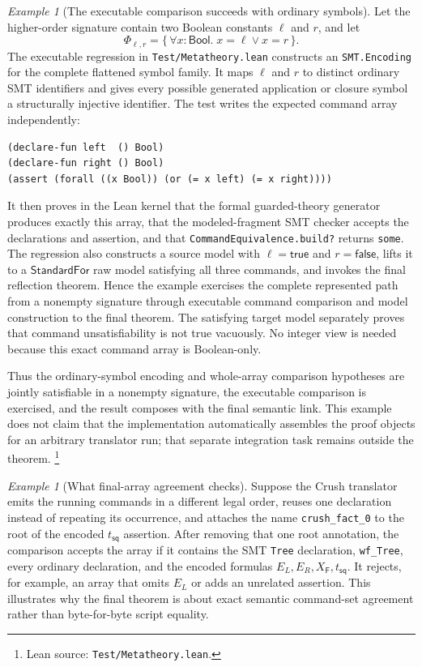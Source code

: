 \documentclass[11pt]{article}
\theoremstyle{remark}
\newtheorem{example}[definition]{Example}
\newcommand{\leanpaths}[1]{\footnote{Lean source: \texttt{#1}.}}
\newcommand{\Bool}{\mathsf{Bool}}
\newcommand{\TreeFun}{\mathsf{F}}
\begin{document}
\begin{example}[The executable comparison succeeds with ordinary symbols]
Let the higher-order signature contain two Boolean constants $\ell$ and $r$, and
let
\[
  \Phi_{\ell,r} = \{\,\forall x:\Bool.\;x=\ell\lor x=r\,\}.
\]
The executable regression in \texttt{Test/Metatheory.lean} constructs an
\texttt{SMT.Encoding} for the complete flattened symbol family. It maps
$\ell$ and $r$ to distinct ordinary SMT identifiers and gives every possible
generated application or closure symbol a structurally injective identifier.
The test writes the expected command array independently:
\begin{verbatim}
(declare-fun left  () Bool)
(declare-fun right () Bool)
(assert (forall ((x Bool)) (or (= x left) (= x right))))
\end{verbatim}
It then proves in the Lean kernel that the formal guarded-theory generator
produces exactly this array, that the modeled-fragment SMT checker accepts the
declarations and assertion, and that \texttt{CommandEquivalence.build?} returns
\texttt{some}. The regression also constructs a source model with
$\ell=\mathsf{true}$ and $r=\mathsf{false}$, lifts it to a
$\mathsf{StandardFor}$ raw model satisfying all three commands, and invokes the
final reflection theorem. Hence the example exercises the complete represented
path from a nonempty signature through executable command comparison and model
construction to the final theorem. The satisfying target model separately
proves that command unsatisfiability is not true vacuously. No integer view is
needed because this exact command array is Boolean-only.

Thus the ordinary-symbol encoding and whole-array comparison hypotheses are
jointly satisfiable in a nonempty signature, the executable comparison is
exercised, and the result composes with the final semantic link.
This example does not claim that the implementation automatically assembles the
proof objects for an arbitrary translator run; that separate integration task
remains outside the theorem.
\leanpaths{Test/Metatheory.lean}
\end{example}

\begin{example}[What final-array agreement checks]
Suppose the Crush translator emits the running commands in a different legal order,
reuses one declaration instead of repeating its occurrence, and attaches the
name \texttt{crush\_fact\_0} to the root of the encoded
$t_{\mathsf{sq}}$ assertion.
After removing that one root annotation, the comparison accepts the array if
it contains the SMT \texttt{Tree} declaration, \texttt{wf\_Tree}, every
ordinary declaration, and the encoded formulas
$E_L,E_R,X_{\TreeFun},t_{\mathsf{sq}}$. It rejects, for example, an array that
omits $E_L$ or adds an unrelated assertion. This illustrates why the final
theorem is about exact semantic command-set agreement rather than byte-for-byte
script equality.
\end{example}
\end{document}
